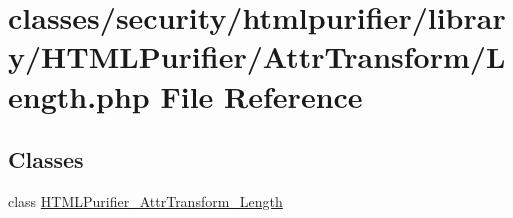 \hypertarget{AttrTransform_2Length_8php}{\section{classes/security/htmlpurifier/library/\+H\+T\+M\+L\+Purifier/\+Attr\+Transform/\+Length.php File Reference}
\label{AttrTransform_2Length_8php}
}
\subsection*{Classes}
\begin{DoxyCompactItemize}
\item 
class \hyperlink{classHTMLPurifier__AttrTransform__Length}{H\+T\+M\+L\+Purifier\+\_\+\+Attr\+Transform\+\_\+\+Length}
\end{DoxyCompactItemize}
